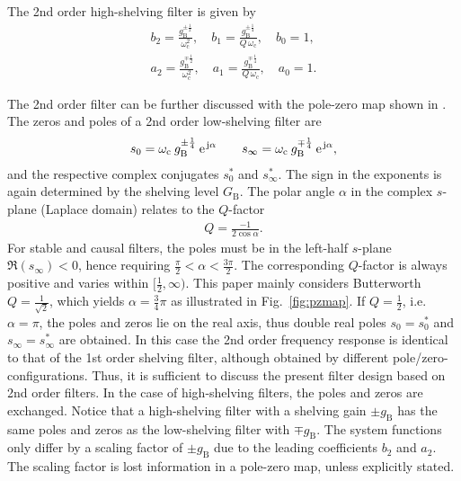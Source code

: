 %
The 2nd order high-shelving filter is given by
\begin{align}
b_2 = \frac{g_\mathrm{B}^{\pm\frac{1}{2}}}{\omega_\mathrm{c}^2},\quad b_1 = \frac{g_\mathrm{B}^{\pm\frac{1}{4}}}{Q\,\omega_\mathrm{c}},\quad b_0 = 1,\\\nonumber
a_2 = \frac{g_\mathrm{B}^{\mp\frac{1}{2}}}{\omega_\mathrm{c}^2},\quad a_1 = \frac{g_\mathrm{B}^{\mp\frac{1}{4}}}{Q\,\omega_\mathrm{c}},\quad a_0 = 1.
\end{align}
%

%
The 2nd order filter can be further discussed with the pole-zero map shown
in .
%
%
The zeros and poles of a 2nd order low-shelving filter are
\begin{align}
s_{0} = \omega_\mathrm{c} \:g_\mathrm{B}^{\pm\frac{1}{4}} \: \e^{\im\alpha}\qquad
s_{\infty} = \omega_\mathrm{c} \: g_\mathrm{B}^{\mp\frac{1}{4}} \: \e^{\im\alpha},
\end{align}
and the respective complex conjugates $s_{0}^{\ast}$ and $s_{\infty}^{\ast}$.
The sign in the exponents is again determined
by the shelving level $G_\mathrm{B}$.
The polar angle $\alpha$ in the complex $s$-plane (Laplace domain)
relates to the $Q$-factor
\begin{align}
Q = \frac{-1}{2\cos\alpha}.
\end{align}
For stable and causal filters,
the poles must be in the left-half $s$-plane $\Re(s_{\infty}) < 0$,
hence requiring $\frac{\pi}{2} < \alpha < \frac{3\pi}{2}$.
The corresponding $Q$-factor is always positive
and varies within $[\frac{1}{2}, \infty)$.
This paper mainly considers Butterworth \cite{Ballou2008} $Q=\frac{1}{\sqrt{2}}$,
which yields $\alpha=\frac{3}{4} \pi$
as illustrated in Fig.~\ref{fig:pzmap}.
If $Q=\frac{1}{2}$, i.e. $\alpha=\pi$,
the poles and zeros lie on the real axis,
thus double real poles $s_{0} = s_{0}^{\ast}$ and
$s_{\infty} = s_{\infty}^{\ast}$ are obtained.
%
In this case the 2nd order frequency
response is identical to that of the 1st order shelving filter, although
obtained by different pole/zero-configurations.
%
Thus, it is sufficient to discuss the present filter design based on
2nd order filters.
%
\NewL In the case of high-shelving filters, the poles and zeros are exchanged. %
Notice that a high-shelving filter with a shelving gain $\pm g_\mathrm{B}$
has the same poles and zeros as the low-shelving filter with $\mp g_\mathrm{B}$.
The system functions only differ by a scaling factor of $\pm g_\mathrm{B}$
due to the leading coefficients $b_{2}$ and $a_{2}$.
%
The scaling factor is lost information in a pole-zero map, unless explicitly
stated.
%
%
%
